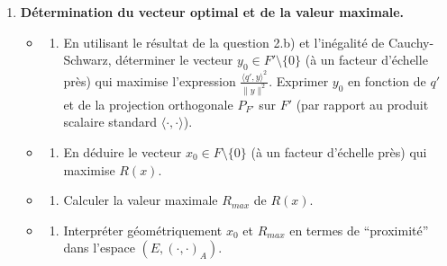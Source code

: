 \documentclass[11pt,a4paper]{report}
\begin{document}
\begin{enumerate}
\begin{itemize}
\begin{enumerate}
    \item
      Montrer que la maximisation de \(R(x)\) pour
      \(x \in F \setminus \{0\}\) est équivalente à la maximisation
      d'une expression de la forme
      \(\frac{\langle q', y \rangle^2}{\|y\|^2}\) pour un certain
      vecteur \(q' \in E\) et \(y\) appartenant à un sous-espace
      \(F' \subseteq E\). Expliciter \(q'\) et \(F'\).
    \end{enumerate}
  \end{itemize}
\item
  \textbf{Détermination du vecteur optimal et de la valeur maximale.}

  \begin{itemize}
  \item
    \begin{enumerate}
    \def\labelenumii{\alph{enumii})}

    \item
      En utilisant le résultat de la question 2.b) et l'inégalité de
      Cauchy-Schwarz, déterminer le vecteur
      \(y_0 \in F' \setminus \{0\}\) (à un facteur d'échelle près) qui
      maximise l'expression \(\frac{\langle q', y \rangle^2}{\|y\|^2}\).
      Exprimer \(y_0\) en fonction de \(q'\) et de la projection
      orthogonale \(P_{F'}\) sur \(F'\) (par rapport au produit scalaire
      standard \(\langle \cdot, \cdot \rangle\)).
    \end{enumerate}
  \item
    \begin{enumerate}
    \def\labelenumii{\alph{enumii})}
    \setcounter{enumii}{1}

    \item
      En déduire le vecteur \(x_0 \in F \setminus \{0\}\) (à un facteur
      d'échelle près) qui maximise \(R(x)\).
    \end{enumerate}
  \item
    \begin{enumerate}
    \def\labelenumii{\alph{enumii})}
    \setcounter{enumii}{2}

    \item
      Calculer la valeur maximale \(R_{max}\) de \(R(x)\).
    \end{enumerate}
  \item
    \begin{enumerate}
    \def\labelenumii{\alph{enumii})}
    \setcounter{enumii}{3}

    \item
      Interpréter géométriquement \(x_0\) et \(R_{max}\) en termes de
      ``proximité'' dans l'espace \((E, (\cdot, \cdot)_A)\).
    \end{enumerate}
  \end{itemize}
\end{enumerate}
\end{document}
